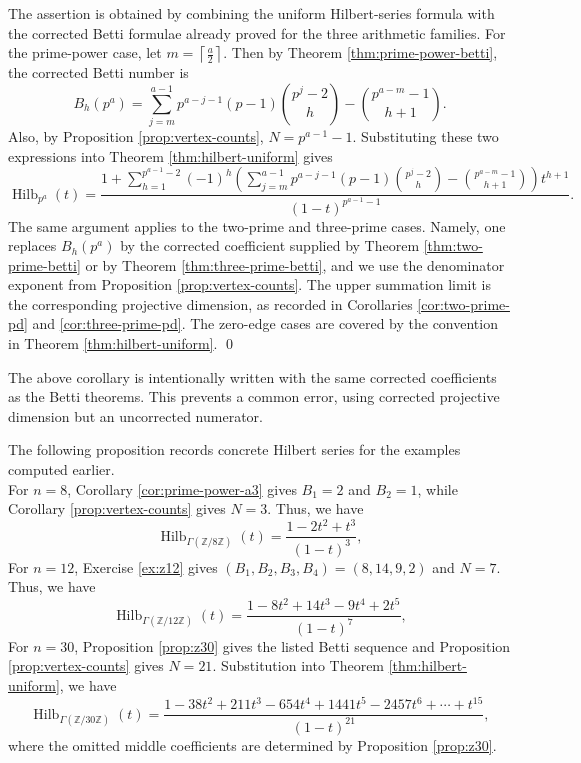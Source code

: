 \documentclass[12pt]{article}
\theoremstyle{definition}
\renewenvironment{proof}{{\bf \noindent Proof.}}{\qed}
\begin{document}
\begin{proof}
	The assertion is obtained by combining the uniform Hilbert-series formula
	with the corrected Betti formulae already proved for the three arithmetic
	families. For the prime-power case, let
	$ m=\left\lceil \frac{a}{2}\right\rceil . $ Then by Theorem \ref{thm:prime-power-betti}, the corrected Betti number is
	$$
	B_h(p^a)
	=
	\sum_{j=m}^{a-1}p^{a-j-1}(p-1)\binom{p^j-2}{h}
	-
	\binom{p^{a-m}-1}{h+1}.
	$$
	Also, by Proposition \ref{prop:vertex-counts},
	$ N=p^{a-1}-1. $
	Substituting these two expressions into Theorem \ref{thm:hilbert-uniform} gives
	$$
	\operatorname{Hilb}_{p^a}(t)=
	\frac{
		1+\sum_{h=1}^{p^{a-1}-2}(-1)^h
		\left(
		\sum_{j=m}^{a-1}p^{a-j-1}(p-1)\binom{p^j-2}{h}
		-
		\binom{p^{a-m}-1}{h+1}
		\right)t^{h+1}
	}
	{(1-t)^{p^{a-1}-1}}.
	$$
	 The same argument applies to the two-prime and three-prime cases.  Namely,
	one replaces $B_h(p^a)$ by the corrected coefficient supplied by Theorem
	\ref{thm:two-prime-betti} or by Theorem \ref{thm:three-prime-betti}, and we use
	the denominator exponent from Proposition \ref{prop:vertex-counts}.  The upper summation
	limit is the corresponding projective dimension, as recorded in Corollaries
	\ref{cor:two-prime-pd} and \ref{cor:three-prime-pd}.  The zero-edge cases are covered by the convention in
	Theorem \ref{thm:hilbert-uniform}.
\end{proof}
\medskip

The above corollary is intentionally written with the same corrected coefficients as the Betti theorems.  This prevents a common error, using corrected projective dimension but an uncorrected numerator.

\medskip

\noindent The following proposition records concrete Hilbert series for the examples computed earlier.\\
For $n=8$, Corollary \ref{cor:prime-power-a3} gives $B_1=2$ and $B_2=1$, while Corollary \ref{prop:vertex-counts} gives $N=3$.  Thus, we have
$$
\operatorname{Hilb}_{\Gamma(\mathbb{Z}/8\mathbb{Z})}(t)=\frac{1-2t^2+t^3}{(1-t)^3},
$$
 For $n=12$, Exercise  \ref{ex:z12} gives $(B_1,B_2,B_3,B_4)=(8,14,9,2)$ and $N=7$.   Thus, we have
$$
\operatorname{Hilb}_{\Gamma(\mathbb{Z}/12\mathbb{Z})}(t)=\frac{1-8t^2+14t^3-9t^4+2t^5}{(1-t)^7},
$$
For $n=30$, Proposition \ref{prop:z30} gives the listed Betti sequence and Proposition \ref{prop:vertex-counts} gives $N=21$.  Substitution into Theorem \ref{thm:hilbert-uniform}, we have
$$
\operatorname{Hilb}_{\Gamma(\mathbb{Z}/30\mathbb{Z})}(t)=\frac{1-38t^2+211t^3-654t^4+1441t^5-2457t^6+\cdots+t^{15}}{(1-t)^{21}},
$$
where the omitted middle coefficients are determined by Proposition \ref{prop:z30}. 
\end{document}
